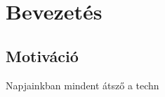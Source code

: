 \documentclass[a4paper,12pt]{report}
\begin{document}




\setcounter{page}{1}


\tableofcontents



\chapter{Bevezetés}

\section{Motiváció}
Napjainkban mindent átsző a techn

\end{document}
